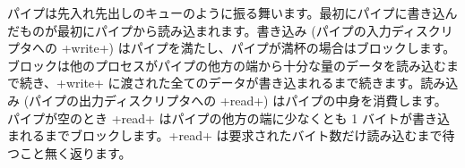 パイプは先入れ先出しのキューのように振る舞います。最初にパイプに書き込んだものが最初にパイプから読み込まれます。書き込み (パイプの入力ディスクリプタへの \ml+write+) はパイプを満たし、パイプが満杯の場合はブロックします。ブロックは他のプロセスがパイプの他方の端から十分な量のデータを読み込むまで続き、\ml+write+ に渡された全てのデータが書き込まれるまで続きます。読み込み (パイプの出力ディスクリプタへの \ml+read+) はパイプの中身を消費します。パイプが空のとき \ml+read+ はパイプの他方の端に少なくとも 1 バイトが書き込まれるまでブロックします。\ml+read+ は要求されたバイト数だけ読み込むまで待つこと無く返ります。

